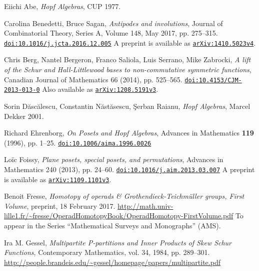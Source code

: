 \documentclass[12pt]{article}
\theoremstyle{plain}
\theoremstyle{definition}
\theoremstyle{remark}
\newcommand{\doi}[1]{\href{http://dx.doi.org/#1}{\texttt{doi:#1}}}
\newcommand{\arxiv}[1]{\href{http://arxiv.org/abs/#1}{\texttt{arXiv:#1}}}
\begin{document}
\begin{thebibliography}{10}                                                                                         %

Eiichi Abe, \textit{Hopf Algebras}, CUP 1977.

Carolina Benedetti, Bruce Sagan,
\textit{Antipodes and involutions},
Journal of Combinatorial Theory, Series A,
Volume 148, May 2017, pp. 275--315.
\newline\doi{10.1016/j.jcta.2016.12.005}
\newline A preprint is available as \arxiv{1410.5023v4}.

Chris Berg, Nantel Bergeron, Franco Saliola, Luis
Serrano, Mike Zabrocki, \textit{A lift of the Schur and Hall-Littlewood bases
to non-commutative symmetric functions}, Canadian Journal of Mathematics 66
(2014), pp. 525--565.\newline
\doi{10.4153/CJM-2013-013-0}
\newline Also available as \arxiv{1208.5191v3}.

Sorin D\u{a}sc\u{a}lescu, Constantin
N\u{a}st\u{a}sescu, \c{S}erban Raianu, \textit{Hopf Algebras}, Marcel Dekker 2001.

Richard Ehrenborg,
\textit{On Posets and Hopf Algebras},
Advances in Mathematics \textbf{119} (1996), pp. 1--25.
\newline\doi{10.1006/aima.1996.0026}

Lo\"ic Foissy,
\textit{Plane posets, special posets, and permutations},
Advances in Mathematics 240 (2013), pp. 24--60.
\newline\doi{10.1016/j.aim.2013.03.007}
\newline A preprint is available as \arxiv{1109.1101v3}.

Benoit Fresse, \textit{Homotopy of operads \&
Grothendieck-Teichm\"{u}ller groups, First Volume},
preprint, 18 February 2017.\newline
\url{http://math.univ-lille1.fr/~fresse/OperadHomotopyBook/OperadHomotopy-FirstVolume.pdf}
\newline
To appear in the Series ``Mathematical Surveys and Monographs'' (AMS).

Ira M. Gessel, \textit{Multipartite
P-partitions and Inner Products of Skew Schur Functions}, Contemporary
Mathematics, vol. 34, 1984, pp. 289--301.\newline%
\url{http://people.brandeis.edu/~gessel/homepage/papers/multipartite.pdf}


\end{thebibliography}
\end{document}

